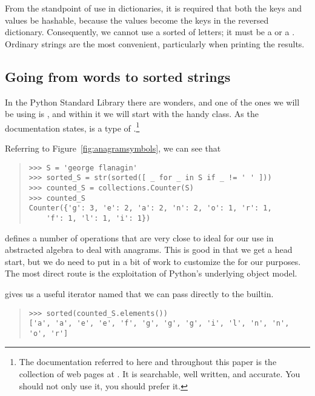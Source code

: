 \documentclass[letterpaper, 11pt]{article}
\begin{document}
From the standpoint of use in dictionaries, it is required that
both the keys and values be hashable, because the values become the
keys in the reversed dictionary. Consequently, we cannot use a
sorted  of letters; it must be a  or a .
Ordinary strings are the most convenient, particularly when 
printing the results.


\subsection{Going from words to sorted strings}

In the Python Standard Library there are wonders, and one of the
ones we will be using is , and within it we will
start with the handy  class. As the documentation
states,  is a type of .\footnote{The
documentation referred to here and throughout this paper is the
collection of web pages at .  It is searchable,
well written, and accurate. You should not only use it, you should
prefer it.}

Referring to Figure~\ref{fig:anagramsymbols}, we can see that 

\begin{quote}
\small
\begin{verbatim}
>>> S = 'george flanagin'
>>> sorted_S = str(sorted([ _ for _ in S if _ != ' ' ]))
>>> counted_S = collections.Counter(S)
>>> counted_S
Counter({'g': 3, 'e': 2, 'a': 2, 'n': 2, 'o': 1, 'r': 1, 
    'f': 1, 'l': 1, 'i': 1})
\end{verbatim}
\end{quote}

 defines a number of operations that are very close
to ideal for our use in abstracted algebra to deal with anagrams.
This is good in that we get a head start, but we do need to put in
a bit of work to customize the  for our purposes.  The
most direct route is the exploitation of Python's underlying object
model.

 gives us a useful iterator named  that
we can pass directly to the  builtin.  

\begin{quote}
\small
\begin{verbatim}
>>> sorted(counted_S.elements())
['a', 'a', 'e', 'e', 'f', 'g', 'g', 'g', 'i', 'l', 'n', 'n', 'o', 'r']
\end{verbatim}
\end{quote}
\end{document}
